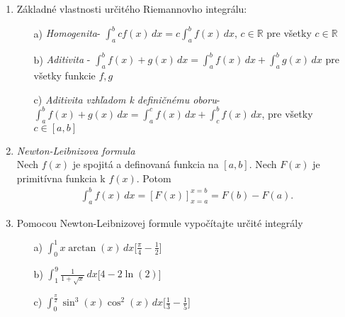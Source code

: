 \begin{enumerate}
\begin{enumerate}
{}
\end{enumerate}

\item Základné vlastnosti určitého Riemannovho integrálu:
\begin{enumerate}
\item[a)]{\textit{Homogenita}\quad -   $\int_a^b cf(x) \, dx = c \int_a^b f(x) \, dx$, $c \in \mathbb{R}$ pre všetky $c \in \mathbb{R}$ }
\item[b)]{\textit{Aditivita} \quad -  $\int_a^b f(x)+g(x) \, dx = \int_a^b f(x) \, dx+\int_a^b g(x) \,dx$ pre všetky funkcie $f,g$  }
\item[c)]{\textit{Aditivita vzhľadom k definičnému oboru}\quad -   \\$\int_a^b f(x)+g(x) \, dx = \int_a^c f(x) \, dx+\int_c^b f(x) \,dx$, pre všetky $c \in [a,b]$}
\end{enumerate}

\item \textit{Newton-Leibnizova formula}\\
Nech $f(x)$ je spojitá a definovaná funkcia na $[a,b]$. Nech $F(x)$ je primitívna funkcia k $f(x)$. Potom
\begin{align*}
\int_a^b f(x) \, dx = [F(x)]_{x=a}^{x=b}=F(b)-F(a).
\end{align*}

\item Pomocou Newton-Leibnizovej formule vypočítajte určité integrály
\begin{enumerate}

\item[a)]{$\int_0^1x\arctan(x)\,dx$}\hspace{\fill}[$\frac{\pi}{4}-\frac{1}{2}$]
\item[b)]{$\int_1^9\frac{1}{1+\sqrt{x}}\,dx$}\hspace{\fill}[$4-2\ln(2)$]
\item[c)]{$\int_0^{\frac{\pi}{2}}\sin^3(x)\cos^2(x)\,dx$}\hspace{\fill}[$\frac{1}{3}-\frac{1}{5}$]


\end{enumerate}
\end{enumerate}
